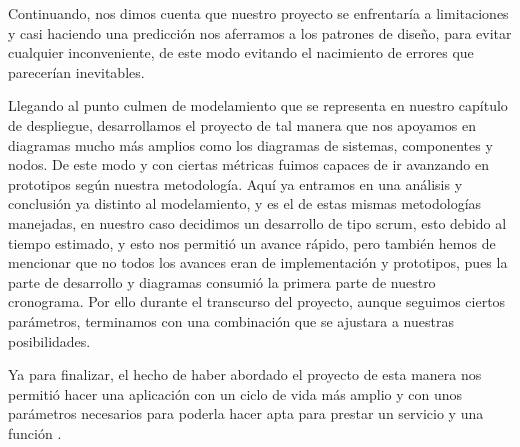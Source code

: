 Continuando, nos dimos cuenta que nuestro proyecto se enfrentaría a limitaciones y casi haciendo una predicción nos aferramos a los patrones de diseño, para evitar cualquier inconveniente, de este modo evitando el nacimiento de errores que parecerían inevitables. 

Llegando al punto culmen de modelamiento que se representa en nuestro capítulo de despliegue, desarrollamos el proyecto de tal manera que nos apoyamos en diagramas mucho más amplios como los diagramas de sistemas, componentes y nodos. De este modo y con ciertas métricas fuimos capaces de ir avanzando en prototipos según nuestra metodología. 
Aquí ya entramos en una análisis y conclusión ya distinto al modelamiento, y es el de estas mismas metodologías manejadas, en nuestro caso decidimos un desarrollo de tipo scrum, esto debido al tiempo estimado, y esto nos permitió un avance rápido, pero también hemos de mencionar que no todos los avances eran de implementación y prototipos, pues la parte de desarrollo y diagramas consumió la primera parte de nuestro cronograma.  Por ello durante el transcurso del proyecto, aunque seguimos ciertos parámetros, terminamos con una combinación que se ajustara a nuestras posibilidades. 

Ya para finalizar, el hecho de haber abordado el proyecto de esta manera nos permitió hacer una aplicación con un ciclo de vida más amplio y con unos parámetros necesarios para poderla hacer apta para prestar un servicio y una función .   

